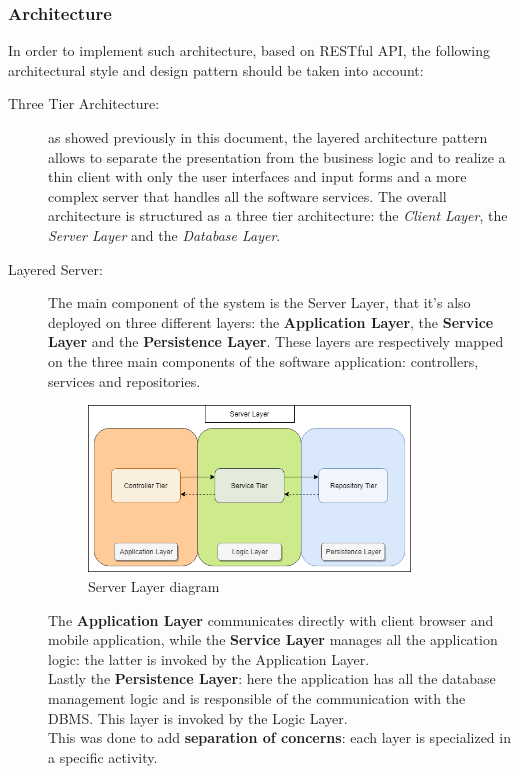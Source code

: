 \documentclass[a4paper]{article}
\begin{document}
    \subsubsection{Architecture}
    In order to implement such architecture, based on RESTful API, the following architectural style and design pattern should be taken into account:
    \begin{description}
        \item[Three Tier Architecture:] as showed previously in this document, the layered architecture pattern allows to separate the presentation from the business logic and to realize a thin client with only the user interfaces and input forms and a more complex server that handles all the software services.
        The overall architecture is structured as a three tier architecture: the \textit{Client Layer}, the \textit{Server Layer} and the \textit{Database Layer}.
        
        \item[Layered Server:] The main component of the system is the Server Layer, that it's also deployed on three different layers: the \textbf{Application Layer}, the \textbf{Service Layer} and the \textbf{Persistence Layer}.
        These layers are respectively mapped on the three main components of the software application: \newline controllers, services and repositories.
        \begin{figure}[!htpb]
            	\centering
            	\includegraphics[width=0.84\textwidth,keepaspectratio]{DD/images/ServerLayer.png}
            	\caption{Server Layer diagram}
        \end{figure}
        \newline
        The \textbf{Application Layer} communicates directly with client browser and mobile application, while the \textbf{Service Layer} manages all the application logic: the latter is invoked by the Application Layer. \\
        Lastly the \textbf{Persistence Layer}: here the application has all the database management logic and is responsible of the communication with the DBMS. This layer is invoked by the Logic Layer.\\
        This was done to add \textbf{separation of concerns}: each layer is specialized in a specific activity.
        

\end{description}
\end{document}
